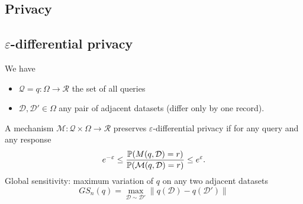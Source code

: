 \documentclass[a4paper,9pt]{extarticle}
\begin{document}
\begin{multicols*}{2}
\section{Privacy}
\subsection{$\varepsilon$-differential privacy}
We have
\begin{itemize}
	\item $\mathcal{Q}=q:\Omega\to\mathcal{R}$ the set of all queries
	\item $\mathcal{D},\mathcal{D}'\in\Omega$ any pair of adjacent datasets (differ only by one record).
\end{itemize}
A mechanism $\mathcal{M}:\mathcal{Q}\times\Omega\to\mathcal{R}$ preserves $\varepsilon$-differential privacy if for any query and any response
\begin{equation*}
	e^{-\varepsilon}\leq\frac{\mathbb{P}(M(q,\mathcal{D})=r)}{\mathbb{P}(\mathcal{M}(q,\mathcal{D})=r)}\leq e^{\varepsilon}.
\end{equation*}
Global sensitivity: maximum variation of $q$ on any two adjacent datasets
\begin{equation*}
	GS_{n}(q)=\max_{\mathcal{D}\sim\mathcal{D}'}\lVert q(\mathcal{D})-q(\mathcal{D}')\rVert
\end{equation*}
\end{multicols*}
\end{document}
